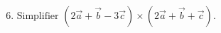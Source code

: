 \documentclass{article}
\begin{document}
\[\text{6. Simplifier } (2\vec{a} + \vec{b} - 3\vec{c}) \times (2\vec{a} + \vec{b} + \vec{c}).\]
\end{document}
